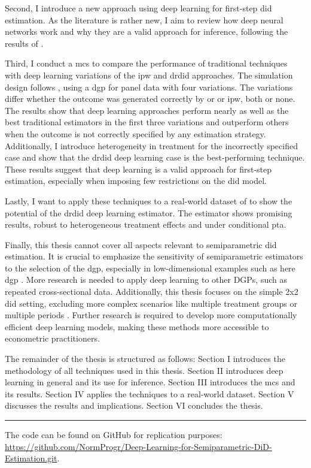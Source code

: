 Second, I introduce a new approach using deep learning for first-step \ac{did} estimation.
As the literature is rather new, I aim to review how deep neural networks work and why they are a valid approach for inference, following the results of \citet{farrellDeepNeuralNetworks2021}.

Third, I conduct a \ac{mcs} to compare the performance of traditional techniques with deep learning variations of the \ac{ipw} and \ac{drdid} approaches.
The simulation design follows \citet{santannaDoublyRobustDifferenceindifferences2020}, using a \ac{dgp} for panel data with four variations.
The variations differ whether the outcome was generated correctly by \ac{or} or \ac{ipw}, both or none.
The results show that deep learning approaches perform nearly as well as the best traditional estimators in the first three variations and outperform others when the outcome is not correctly specified by any estimation strategy.
Additionally, I introduce heterogeneity in treatment for the incorrectly specified case and show that the \ac{drdid} deep learning case is the best-performing technique.
These results suggest that deep learning is a valid approach for first-step estimation, especially when imposing few restrictions on the \ac{did} model.

Lastly, I want to apply these techniques to a real-world dataset of \citet{meyer1990workers} to show the potential of the \ac{drdid} deep learning estimator. %
The estimator shows promising results, robust to heterogeneous treatment effects and under conditional \ac{pta}.

Finally, this thesis cannot cover all aspects relevant to semiparametric \ac{did} estimation.
It is crucial to emphasize the sensitivity of semiparametric estimators to the selection of the \ac{dgp}, especially in low-dimensional examples such as here \ac{dgp} \citep{zimmert2018efficient}.
More research is needed to apply deep learning to other DGPs, such as repeated cross-sectional data.
Additionally, this thesis focuses on the simple 2x2 \ac{did} setting, excluding more complex scenarios like multiple treatment groups or multiple periods \citep[see][]{callawayDifferenceinDifferencesMultipleTime2021,goodman-baconDifferenceindifferencesVariationTreatment2021}.
Further research is required to develop more computationally efficient deep learning models, making these methods more accessible to econometric practitioners.

The remainder of the thesis is structured as follows: Section I introduces the methodology of all techniques used in this thesis.
Section II introduces deep learning in general and its use for inference.
Section III introduces the \ac{mcs} and its results.
Section IV applies the techniques to a real-world dataset.
Section V discusses the results and implications.
Section VI concludes the thesis.

\noindent\rule{3cm}{0.5pt} %

\small
The code can be found on GitHub for replication purposes:
\url{https://github.com/NormProgr/Deep-Learning-for-Semiparametric-DiD-Estimation.git}.
\normalsize
